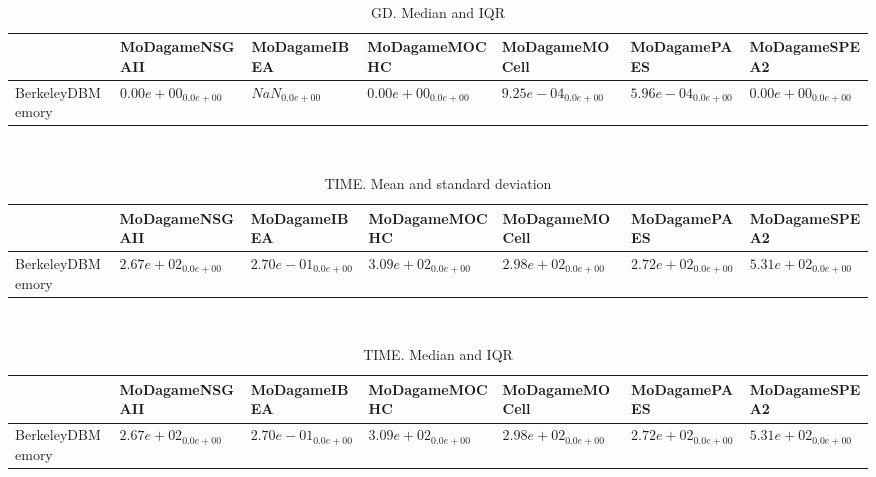 \documentclass{article}
\begin{document}
\
\begin{table}
\caption{GD. Median and IQR}
\label{table:median.GD}
\begin{scriptsize}
\centering
\begin{tabular}{lllllll}
\hline & MoDagameNSGAII & MoDagameIBEA & MoDagameMOCHC & MoDagameMOCell & MoDagamePAES &  MoDagameSPEA2\\
\hline
BerkeleyDBMemory & \cellcolor{gray95}$  0.00e+00_{ 0.0e+00}$ & $       NaN_{ 0.0e+00}$ & \cellcolor{gray25}$  0.00e+00_{ 0.0e+00}$ & $  9.25e-04_{ 0.0e+00}$ & $  5.96e-04_{ 0.0e+00}$ & $  0.00e+00_{ 0.0e+00}$ \\
\hline
\end{tabular}
\end{scriptsize}
\end{table}
\
\begin{table}
\caption{TIME. Mean and standard deviation}
\label{table:mean.TIME}
\centering
\begin{scriptsize}
\begin{tabular}{lllllll}
\hline & MoDagameNSGAII & MoDagameIBEA & MoDagameMOCHC & MoDagameMOCell & MoDagamePAES &  MoDagameSPEA2\\
\hline
BerkeleyDBMemory & \cellcolor{gray25}$  2.67e+02_{ 0.0e+00}$ & \cellcolor{gray95}$  2.70e-01_{ 0.0e+00}$ & $  3.09e+02_{ 0.0e+00}$ & $  2.98e+02_{ 0.0e+00}$ & $  2.72e+02_{ 0.0e+00}$ & $  5.31e+02_{ 0.0e+00}$ \\
\hline
\end{tabular}
\end{scriptsize}
\end{table}
\
\begin{table}
\caption{TIME. Median and IQR}
\label{table:median.TIME}
\begin{scriptsize}
\centering
\begin{tabular}{lllllll}
\hline & MoDagameNSGAII & MoDagameIBEA & MoDagameMOCHC & MoDagameMOCell & MoDagamePAES &  MoDagameSPEA2\\
\hline
BerkeleyDBMemory & \cellcolor{gray25}$  2.67e+02_{ 0.0e+00}$ & \cellcolor{gray95}$  2.70e-01_{ 0.0e+00}$ & $  3.09e+02_{ 0.0e+00}$ & $  2.98e+02_{ 0.0e+00}$ & $  2.72e+02_{ 0.0e+00}$ & $  5.31e+02_{ 0.0e+00}$ \\
\hline
\end{tabular}
\end{scriptsize}
\end{table}
\end{document}
